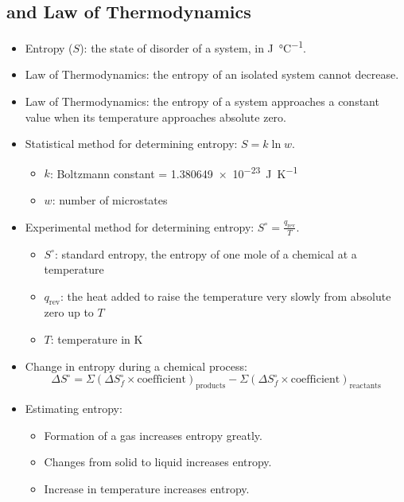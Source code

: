 \documentclass{article}
\begin{document}
\subsection{ and  Law of Thermodynamics}

\begin{itemize}
    \item Entropy ($S$): the state of disorder of a system, in \si[per-mode = fraction]{\joule\per\celsius}.
    \item {} Law of Thermodynamics: the entropy of an isolated system cannot decrease.
    \item {} Law of Thermodynamics: the entropy of a system approaches a constant value when its temperature approaches absolute zero.
    \item Statistical method for determining entropy: $S = k \ln w$.
    \begin{itemize}
        \item $k$: Boltzmann constant = \SI[per-mode = fraction]{1.380649e-23}{\joule\per\kelvin}
        \item $w$: number of microstates
    \end{itemize}
    \item Experimental method for determining entropy: $S^\circ = \frac{q_\text{rev}}{T}$.
    \begin{itemize}
        \item $S^\circ$: standard entropy, the entropy of one mole of a chemical at a temperature
        \item $q_\text{rev}$: the heat added to raise the temperature very slowly from absolute zero up to $T$
        \item $T$: temperature in \si{\kelvin}
    \end{itemize}
    \item Change in entropy during a chemical process:
    \begin{equation*}
        \Delta S^\circ = \Sigma (\Delta S_f^\circ \times \text{coefficient})_{\text{products}} - \Sigma (\Delta S_f^\circ \times \text{coefficient})_{\text{reactants}}
    \end{equation*}
    \item Estimating entropy:
    \begin{itemize}
        \item Formation of a gas increases entropy greatly.
        \item Changes from solid to liquid increases entropy.
        \item Increase in temperature increases entropy.
    \end{itemize}
\end{itemize}
\end{document}
